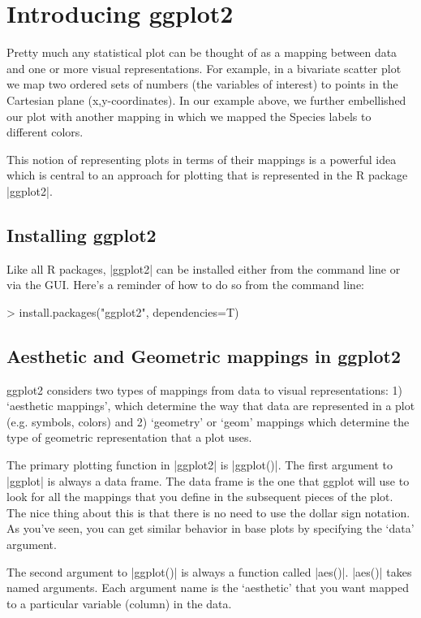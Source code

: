 \section{Introducing ggplot2}

Pretty much any statistical plot can be thought of as a mapping between data and one or more visual representations. For example, in a bivariate scatter plot we map two ordered sets of numbers (the variables of interest) to points in the Cartesian plane (x,y-coordinates).  In our example above, we further embellished our plot with another mapping in which we mapped the Species labels to different colors.

This notion of representing plots in terms of their mappings is a powerful idea which is central to an approach for plotting that is represented in the R package |ggplot2|.

\subsection{Installing ggplot2}

Like all R packages, |ggplot2| can be installed either from the command line or via the GUI. Here's a reminder of how to do so from the command line:
%
\begin{R}
> install.packages("ggplot2", dependencies=T)
\end{R}

\subsection{Aesthetic and Geometric mappings in ggplot2}

ggplot2 considers two types of mappings from data to visual representations: 1) `aesthetic mappings', which determine the way that data are represented in a plot (e.g. symbols, colors) and 2) `geometry' or `geom' mappings which determine the type of geometric representation that a plot uses.  

The primary plotting function in |ggplot2| is |ggplot()|. The first argument to |ggplot| is
always a data frame. The data frame is the one that ggplot will use to look for all the mappings that you define in the subsequent pieces of the plot. The nice thing about this is that there is no need to use
the dollar sign notation. As you've seen, you can get similar behavior in base plots by specifying the `data' argument.

The second argument to |ggplot()| is always a function called |aes()|. |aes()| takes named
arguments. Each argument name is the `aesthetic' that you want mapped to a particular variable (column) in the data. 

